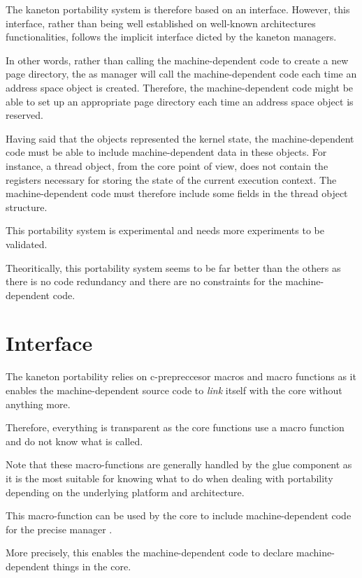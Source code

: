 The kaneton portability system is therefore based on an interface. However,
this interface, rather than being well established on well-known architectures
functionalities, follows the implicit interface dicted by the kaneton managers.

In other words, rather than calling the machine-dependent code to create
a new page directory, the as manager will call the machine-dependent code
each time an address space object is created. Therefore, the
machine-dependent code might be able to set up an appropriate page directory
each time an address space object is reserved.

Having said that the objects represented the kernel state, the
machine-dependent code must be able to include machine-dependent data in
these objects. For instance, a thread object, from the core point of view,
does not contain the registers necessary for storing the state of the current
execution context. The machine-dependent code must therefore include some
fields in the thread object structure.

This portability system is experimental and needs more experiments to be
validated.

Theoritically, this portability system seems to be far better than the others
as there is no code redundancy and there are no constraints for the
machine-dependent code.

%
%

\section{Interface}

The kaneton portability relies on c-prepreccesor macros and macro functions
as it enables the machine-dependent source code to \textit{link} itself with
the core without anything more.

Therefore, everything is transparent as the core functions use a macro function
and do not know what is called.

Note that these macro-functions are generally handled by the glue component
as it is the most suitable for knowing what to do when dealing with
portability depending on the underlying platform and architecture.

	 {
	   This macro-function can be used by the core to include
	   machine-dependent code for the precise manager .

	   \-

	   More precisely, this enables the machine-dependent code to declare
	   machine-dependent things in the core.
	 }

